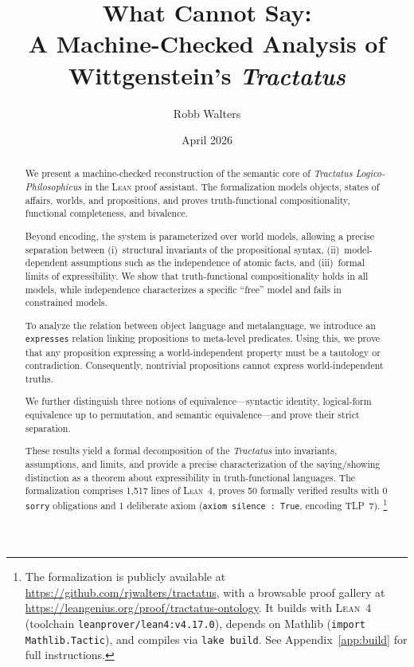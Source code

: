 \documentclass[10pt, letterpaper]{article}
\title{What \Lean{} Cannot Say:\\
A Machine-Checked Analysis of Wittgenstein's \emph{Tractatus}}
\author{Robb Walters}
\date{April 2026}
\theoremstyle{definition}
\theoremstyle{remark}
\newcommand{\Lean}{\textsc{Lean}}
\begin{document}
\maketitle

\begin{abstract}
We present a machine-checked reconstruction of the semantic core
of \emph{Tractatus Logico-Philosophicus} in the \Lean{} proof
assistant.  The formalization models objects, states of affairs,
worlds, and propositions, and proves truth-functional
compositionality, functional completeness, and bivalence.

Beyond encoding, the system is parameterized over world models,
allowing a precise separation between (i)~structural invariants
of the propositional syntax, (ii)~model-dependent assumptions
such as the independence of atomic facts, and (iii)~formal limits
of expressibility.  We show that truth-functional compositionality
holds in all models, while independence characterizes a specific
``free'' model and fails in constrained models.

To analyze the relation between object language and metalanguage,
we introduce an \texttt{expresses} relation linking propositions
to meta-level predicates.  Using this, we prove that any
proposition expressing a world-independent property must be a
tautology or contradiction.  Consequently, nontrivial propositions
cannot express world-independent truths.

We further distinguish three notions of
equivalence---syntactic identity, logical-form equivalence up to
permutation, and semantic equivalence---and prove their strict
separation.

These results yield a formal decomposition of the \emph{Tractatus}
into invariants, assumptions, and limits, and provide a precise
characterization of the saying/showing distinction as a theorem
about expressibility in truth-functional languages.
The formalization comprises 1,517 lines of \Lean~4, proves 50
formally verified results with 0 \texttt{sorry} obligations
and 1 deliberate axiom (\texttt{axiom silence : True}, encoding
TLP~7).%
\footnote{The formalization is publicly available at
  \url{https://github.com/rjwalters/tractatus},
  with a browsable proof gallery at
  \url{https://leangenius.org/proof/tractatus-ontology}.
  It builds with \Lean~4 (toolchain \texttt{leanprover/lean4:v4.17.0}),
  depends on Mathlib (\texttt{import Mathlib.Tactic}), and compiles via
  \texttt{lake build}.  See Appendix~\ref{app:build} for full
  instructions.}
\end{abstract}
\end{document}
